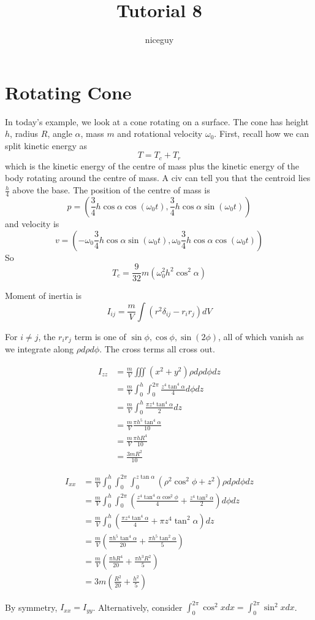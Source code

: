 \documentclass[12pt]{article}
\title{Tutorial 8}
\author{niceguy}
\begin{document}
\maketitle

\section{Rotating Cone}

In today's example, we look at a cone rotating on a surface. The cone has height $h$, radius $R$, angle $\alpha$, mass $m$ and rotational velocity $\omega_0$. First, recall how we can split kinetic energy as
$$T = T_c + T_r$$
which is the kinetic energy of the centre of mass plus the kinetic energy of the body rotating around the centre of mass. A civ can tell you that the centroid lies $\frac{h}{4}$ above the base. The position of the centre of mass is
$$p = \left(\frac{3}{4}h\cos\alpha\cos(\omega_0t), \frac{3}{4}h\cos\alpha\sin(\omega_0t)\right)$$
and velocity is
$$v = (-\omega_0\frac{3}{4}h\cos\alpha\sin(\omega_0t), \omega_0\frac{3}{4}h\cos\alpha\cos(\omega_0t))$$
So
$$T_c = \frac{9}{32}m(\omega_0^2h^2\cos^2\alpha)$$

Moment of inertia is
$$I_{ij} = \frac{m}{V}\int(r^2\delta_{ij} - r_ir_j)dV$$

For $i \neq j$, the $r_ir_j$ term is one of $\sin\phi,\cos\phi,\sin(2\phi)$, all of which vanish as we integrate along $\rho d\rho d\phi$. The cross terms all cross out.

\begin{align*}
    I_{zz} &= \frac{m}{V}\iiint (x^2+y^2)\rho d\rho d\phi dz \\
           &= \frac{m}{V} \int_0^h \int_0^{2\pi} \frac{z^4\tan^4\alpha}{4} d\phi dz \\
           &= \frac{m}{V} \int_0^h \frac{\pi z^4\tan^4\alpha}{2} dz \\
           &= \frac{m}{V} \frac{\pi h^5\tan^4\alpha}{10} \\
           &= \frac{m}{V} \frac{\pi hR^4}{10} \\
           &= \frac{3mR^2}{10}
\end{align*}

\begin{align*}
    I_{xx} &= \frac{m}{V} \int_0^h \int_0^{2\pi} \int_0^{z\tan\alpha} (\rho^2\cos^2\phi + z^2) \rho d\rho d\phi dz \\
           &= \frac{m}{V} \int_0^h \int_0^{2\pi} \left(\frac{z^4\tan^4\alpha\cos^2\phi}{4} + \frac{z^4\tan^2\alpha}{2}\right) d\phi dz \\
           &= \frac{m}{V} \int_0^h \left(\frac{\pi z^4\tan^4\alpha}{4} + \pi z^4\tan^2\alpha\right) dz \\
           &= \frac{m}{V} \left(\frac{\pi h^5\tan^4\alpha}{20} + \frac{\pi h^5\tan^2\alpha}{5}\right) \\
           &= \frac{m}{V} \left(\frac{\pi hR^4}{20} + \frac{\pi h^3R^2}{5}\right) \\
           &= 3m\left(\frac{R^2}{20} + \frac{h^2}{5}\right)
\end{align*}

By symmetry, $I_{xx} = I_{yy}$. Alternatively, consider $\int_0^{2\pi} \cos^2x dx = \int_0^{2\pi} \sin^2x dx$.
\end{document}
